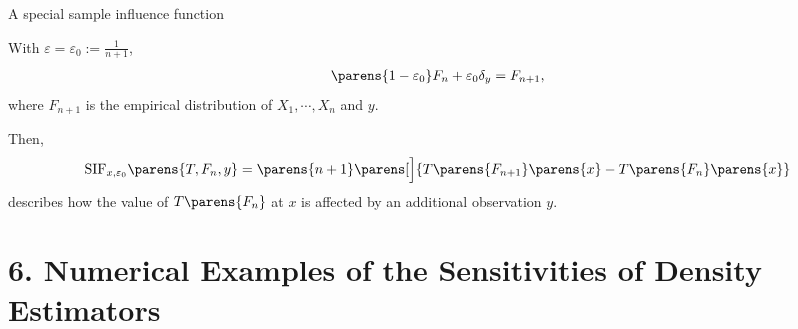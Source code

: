 \documentclass[aspectratio=169,xcolor=dvipsnames]{beamer}
\begin{document}
\begin{frame}{A special sample influence function}

	With $\varepsilon = \varepsilon_0 := \frac{1}{n+1}$, 
	\begin{align*}
		\parens{1 - \varepsilon_0} F_n + \varepsilon_0 \delta_y = F_{n+1}, 
	\end{align*}
	where $F_{n+1}$ is the empirical distribution of $X_1, \cdots, X_n$ and $y$. 
	
	\vspace{10pt}
	
	Then, 
	\begin{align*}
		\mathrm{SIF}_{x, \varepsilon_0} \parens{T, F_n, y} = \parens{n+1} \parens[\Big]{T \parens{F_{n+1}} \parens{x} - T \parens{F_n} \parens{x}}
	\end{align*}
	describes how the value of $T \parens{F_n}$ at $x$ is affected by an additional observation $y$. 
	
\end{frame}


%	
%	
%	
%	
%	
%	


\section{6. Numerical Examples of the Sensitivities of Density Estimators}
\end{document}
